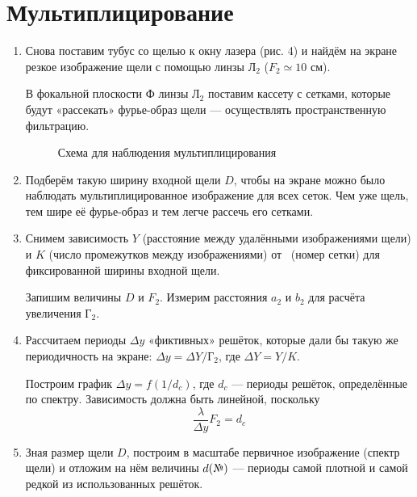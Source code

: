 \section{\label{sec:level1}Мультиплицирование}

\begin{enumerate}
    \item
    Снова поставим тубус со щелью к окну лазера (рис. 4) и найдём на экране резкое изображение щели с помощью линзы $\text{Л}_2$ ($F_2 \simeq 10$ см).
    
    В фокальной плоскости Ф линзы $\text{Л}_2$ поставим кассету с сетками, которые будут «рассекать» фурье-образ щели — осуществлять пространственную фильтрацию.
    
    \begin{figure}[h]
    \caption{Схема для наблюдения мультиплицирования}
    \end{figure}
    
    \item
    Подберём такую ширину входной щели $D$, чтобы на экране можно было наблюдать мультиплицированное изображение для всех сеток. Чем уже щель, тем шире её фурье-образ и тем легче рассечь его сетками.
    
    \item
    Снимем зависимость $Y$ (расстояние между удалёнными изображениями щели) и $K$ (число промежутков между изображениями) от \textnumero~(номер сетки) для фиксированной ширины входной щели.
    
    Запишим величины $D$ и $F_2$. Измерим расстояния $a_2$ и $b_2$ для расчёта увеличения $\text{Г}_2$.
    
    \item
    Рассчитаем периоды $\Delta y$ «фиктивных» решёток, которые дали бы такую же периодичность на экране: $\Delta y = \Delta Y / \text{Г}_2$, где $\Delta Y = Y/K$.
    
    Построим график $\Delta y = f(1/d_c)$, где $d_c$ — периоды решёток, определённые по спектру. Зависимость должна быть линейной, поскольку
    $$\frac{\lambda}{\Delta y} F_2 = d_c$$
    \begin{figure}[h]
    \end{figure}
    
    \item
    Зная размер щели $D$, построим в масштабе первичное изображение (спектр щели) и отложим на нём величины $d(\text{\textnumero})$ — периоды самой плотной и самой редкой из использованных решёток.
    
\end{enumerate}


